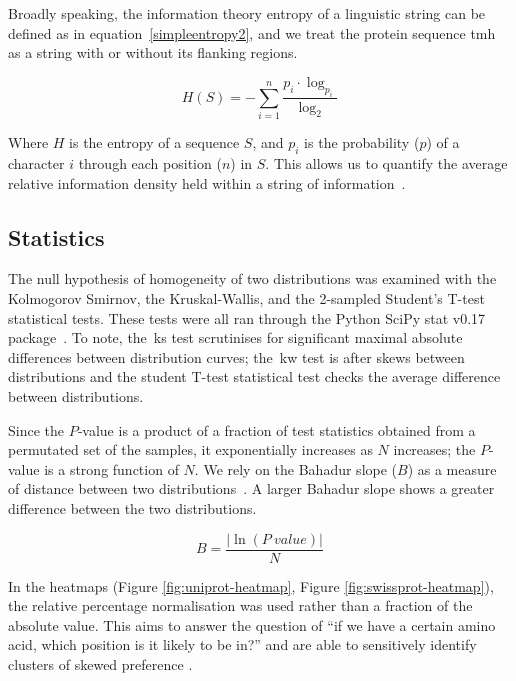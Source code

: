 Broadly speaking, the information theory entropy of a linguistic string can be defined as in equation~\ref{simpleentropy2}, and we treat the protein sequence \gls{tmh} as a string with or without its flanking regions.

\begin{equation} \label{simpleentropy2}
  H(S)=-\sum _{i=1}^{n}{\frac{{p}_{i}\cdot \log _{{p}_{i}}}{\log_{2}}}
\end{equation}

Where $H$ is the entropy of a sequence $S$, and $p_i$ is the probability ($p$) of a character $i$ through each position ($n$) in $S$. This allows us to quantify the average relative information density held within a string of information~\cite{Shannon1948}.

\subsection{Statistics}

The null hypothesis of homogeneity of two distributions was examined with the Kolmogorov Smirnov, the Kruskal-Wallis, and the 2-sampled Student's T-test statistical tests.
These tests were all ran through the Python SciPy stat v0.17 package~\cite{VanderWalt2011}.
To note, the~\gls{ks} test scrutinises for significant maximal absolute differences between distribution curves; the~\gls{kw} test is after skews between distributions and the student T-test statistical test checks the average difference between distributions.

Since the $P$\-‑value is a product of a fraction of test statistics obtained from a permutated set of the samples, it exponentially increases as $N$ increases; the $P$\--value is a strong function of $N$.
We rely on the Bahadur slope ($B$) as a measure of distance between two distributions~\cite{Bahadur1967, Bahadur1971, Sunyaev1998, Baker2017}. A larger Bahadur slope shows a greater difference between the two distributions.

\begin{equation} \label{eq:bahadur2}
B=\frac{|\ln(P~value)|}{N}
\end{equation}

In the heatmaps (Figure \ref{fig:uniprot-heatmap}, Figure \ref{fig:swissprot-heatmap}), the relative percentage normalisation was used rather than a fraction of the absolute value.
This aims to answer the question of ``if we have a certain amino acid, which position is it likely to be in?'' and are able to sensitively identify clusters of skewed preference \cite{Baker2017}.


